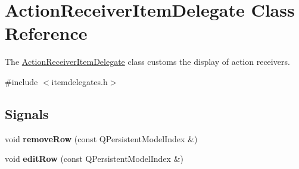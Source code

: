 \hypertarget{class_action_receiver_item_delegate}{\section{\-Action\-Receiver\-Item\-Delegate \-Class \-Reference}
\label{class_action_receiver_item_delegate}
}


\-The \hyperlink{class_action_receiver_item_delegate}{\-Action\-Receiver\-Item\-Delegate} class customs the display of action receivers.  




{\ttfamily \#include $<$itemdelegates.\-h$>$}

\subsection*{\-Signals}
\begin{DoxyCompactItemize}
\item 
\hypertarget{class_action_receiver_item_delegate_a082732d67b09bb5707e864cfd67290ca}{void {\bfseries remove\-Row} (const \-Q\-Persistent\-Model\-Index \&)}\label{class_action_receiver_item_delegate_a082732d67b09bb5707e864cfd67290ca}

\item 
\hypertarget{class_action_receiver_item_delegate_ada894d96fe86259aa5a8416031c92d56}{void {\bfseries edit\-Row} (const \-Q\-Persistent\-Model\-Index \&)}\label{class_action_receiver_item_delegate_ada894d96fe86259aa5a8416031c92d56}

\end{DoxyCompactItemize}

